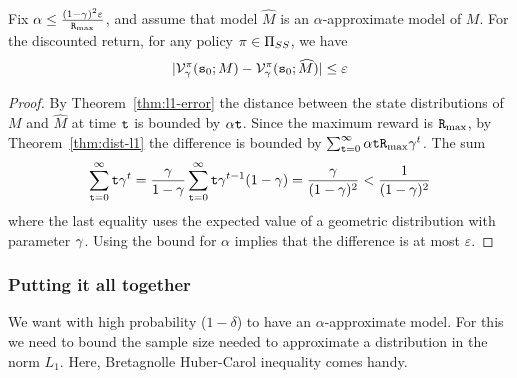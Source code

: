 \begin{lemma}
\label{lemma:approx-model-dic}
%
Fix $\alpha\leq \frac{(1-\gamma)^2\varepsilon}{{\tt R}_{\max }}$, and
assume that model $\widehat{M}$ is an $\alpha$-approximate model of $M$. For the discounted return, for any policy $\pi \in  {\Pi_{SS}}$, we have
\[
|\mathcal{V}^\pi_\gamma({\tt s}_0;M)-\mathcal{V}^\pi_\gamma({\tt s}_0;\widehat{M})|\leq
\varepsilon
\]
\end{lemma}

\begin{proof}
By Theorem~\ref{thm:l1-error} the distance between the state distributions of $M$ and $\widehat{M}$ at time ${\tt t}$ is bounded by $\alpha{\tt t}$. Since the maximum reward  is ${\tt R}_{\max }$, by Theorem~\ref{thm:dist-l1} the difference is bounded by
$\sum_{{\tt t}=0}^\infty \alpha{\tt t} {\tt R}_{\max }\gamma^t$.
The sum 
$$\sum_{{\tt t}=0}^\infty {\tt t} \gamma^t=\frac{\gamma}{1-\gamma}\sum_{{\tt t}=0}^\infty {\tt t} \gamma^{t-1}(1-\gamma)=\frac{\gamma}{(1-\gamma)^2}< \frac{1}{(1-\gamma)^2}$$
where the last equality uses the expected value of a geometric distribution with parameter $\gamma$.
%
Using the bound for $\alpha$ implies that the difference is at most $\varepsilon$.
%
\end{proof}

\subsubsection{Putting it all together}

We want with high probability ($1-\delta$) to have an
$\alpha$-approximate model. For this we need to bound the sample
size needed to approximate a distribution in the norm $L_1$. Here,
Bretagnolle Huber-Carol inequality comes handy.

